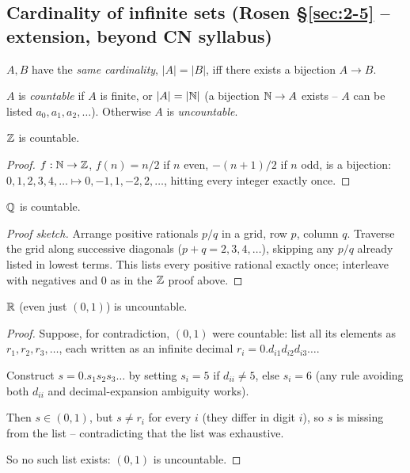 \documentclass[11pt]{article}
\begin{document}
\subsection{Cardinality of infinite sets (Rosen \S\ref{sec:2-5} -- extension, beyond CN syllabus)}

\begin{definition}
$A,B$ have the \emph{same cardinality}, $|A|=|B|$, iff there exists a bijection $A\to B$.
\end{definition}

\begin{definition}[Countable]
$A$ is \emph{countable} if $A$ is finite, or $|A|=|\mathbb{N}|$ (a bijection $\mathbb{N}\to A$ exists -- $A$ can be listed $a_0,a_1,a_2,\dots$). Otherwise $A$ is \emph{uncountable}.
\end{definition}

\begin{theorem}
$\mathbb{Z}$ is countable.
\end{theorem}
\begin{proof}
$f:\mathbb{N}\to\mathbb{Z}$, $f(n) = n/2$ if $n$ even, $-(n+1)/2$ if $n$ odd, is a bijection: $0,1,2,3,4,\dots \mapsto 0,-1,1,-2,2,\dots$, hitting every integer exactly once.
\end{proof}

\begin{theorem}
$\mathbb{Q}$ is countable.
\end{theorem}
\begin{proof}[Proof sketch]
Arrange positive rationals $p/q$ in a grid, row $p$, column $q$. Traverse the grid along successive diagonals ($p+q=2,3,4,\dots$), skipping any $p/q$ already listed in lowest terms. This lists every positive rational exactly once; interleave with negatives and $0$ as in the $\mathbb{Z}$ proof above.
\end{proof}

\bigskip
\begin{theorem}
$\mathbb{R}$ (even just $(0,1)$) is uncountable.
\end{theorem}
\begin{proof}
Suppose, for contradiction, $(0,1)$ were countable: list all its elements as $r_1,r_2,r_3,\dots$, each written as an infinite decimal $r_i = 0.d_{i1}d_{i2}d_{i3}\dots$.

Construct $s = 0.s_1s_2s_3\dots$ by setting $s_i = 5$ if $d_{ii}\neq5$, else $s_i=6$ (any rule avoiding both $d_{ii}$ and decimal-expansion ambiguity works).

Then $s \in (0,1)$, but $s\neq r_i$ for every $i$ (they differ in digit $i$), so $s$ is missing from the list -- contradicting that the list was exhaustive.

So no such list exists: $(0,1)$ is uncountable.
\end{proof}
\end{document}
